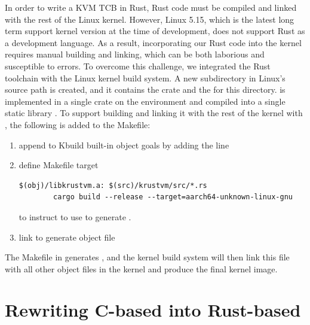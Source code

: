 In order to write a KVM TCB in Rust, Rust code must be compiled and linked with
the rest of the Linux kernel.
However, Linux 5.15, which is the latest long term support kernel version at
the time of \rustsec{} development, does not support Rust as a development
language. As a result, incorporating our Rust code into the kernel requires
manual building and linking, which can be both laborious and susceptible to
errors.
To overcome this challenge, we integrated the Rust toolchain with the Linux
kernel build system. A new subdirectory in Linux's source path
 is created, and it contains the \rustcore{} crate
and the  for this directory.
\rustcore{} is implemented in a single crate on the  environment
and compiled into a single static library .
To support building  and linking it with the
rest of the kernel with , the following is added to the Makefile:
\begin{enumerate}
\item{append  to Kbuild built-in object goals  by adding the line }
\item{define Makefile target
\begin{listing}[hbtp]
    \begin{verbatim}
$(obj)/libkrustvm.a: $(src)/krustvm/src/*.rs
        cargo build --release --target=aarch64-unknown-linux-gnu
    \end{verbatim}
    \label{lst:Makefile}
    \vspace{-1.2cm}
\end{listing}
to instruct  to use  to generate .
}
\item{link  to generate object file }
\end{enumerate}
The Makefile in  generates ,
and the kernel build system will then link this file with all other object
files in the kernel and produce the final kernel image.

\section{Rewriting C-based \secore{} into Rust-based \rustcore{}}

%

